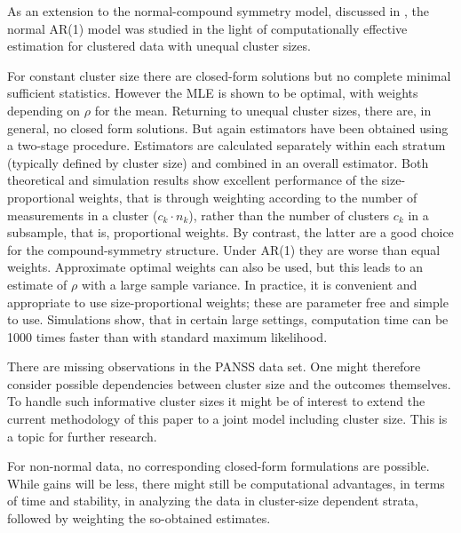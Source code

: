\documentclass[11pt,a5paper,twoside]{book}
\begin{document}
As an extension to the normal-compound symmetry model, discussed in \cite{hermans2017_cs}, the normal AR(1) model was studied in the light of computationally effective estimation for clustered data with unequal cluster sizes.

For constant cluster size there are closed-form solutions but no complete minimal sufficient statistics. However the MLE is shown to be optimal, with weights depending on $\rho$ for the mean. Returning to unequal cluster sizes, there are, in general, no closed form solutions. But again estimators have been obtained using a two-stage procedure. Estimators are calculated separately within each stratum (typically defined by cluster size) and combined in an overall estimator. Both theoretical and simulation results show excellent performance of the size-proportional weights, that is through weighting according to the number of measurements in a cluster ($c_k\cdot n_k$), rather than the number of clusters $c_k$ in a subsample, that is, proportional weights. By contrast, the latter are a good choice for the compound-symmetry structure. Under AR(1) they are worse than equal weights. Approximate optimal weights can also be used, but this leads to an estimate of $\rho$ with a large sample variance. 
In practice, it is convenient and appropriate to use  size-proportional weights; these are parameter free and simple to use. Simulations show, that in certain large settings, computation time can be 1000 times faster than with standard maximum likelihood.

There are missing observations in the PANSS data set. One might therefore consider possible dependencies between cluster size and the outcomes themselves. To handle such informative cluster sizes  it might be of interest to extend the current methodology of this paper to a joint model including cluster size. This is a topic for further research. 

For non-normal data, no corresponding closed-form formulations are possible. While gains will be less, there might still be computational advantages, in terms of time and stability, in analyzing the data in cluster-size dependent strata, followed by weighting the so-obtained estimates. 
\end{document}
